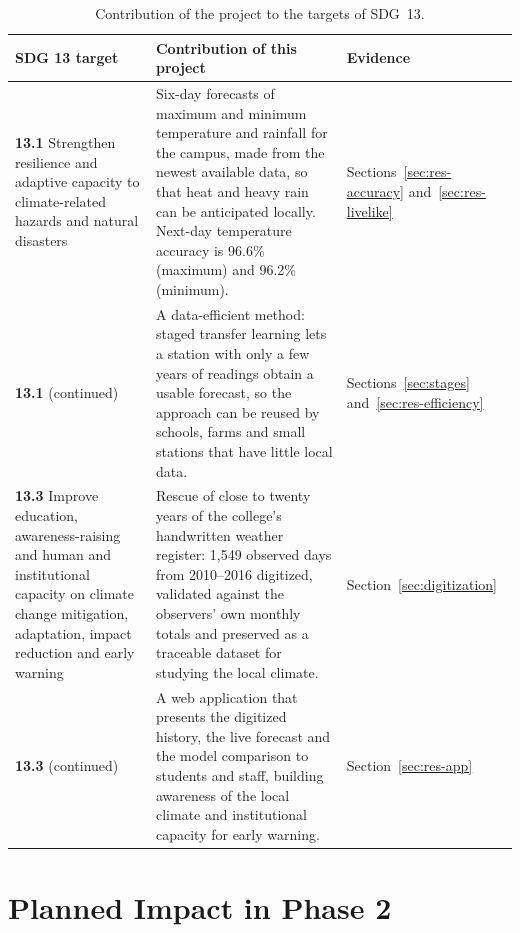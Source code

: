 \begin{table}[!htbp]
    \centering
    \caption{Contribution of the project to the targets of SDG~13.}\label{tab:sdg}
    \footnotesize
    \begin{tabularx}{\textwidth}{|L{3.6cm}|Y|L{2.6cm}|}
        \hline
        \textbf{SDG 13 target} & \textbf{Contribution of this project} & \textbf{Evidence} \\ \hline
        \textbf{13.1} Strengthen resilience and adaptive capacity to climate-related hazards and natural disasters &
        Six-day forecasts of maximum and minimum temperature and rainfall for the campus, made from the newest available data, so that heat and heavy rain can be anticipated locally. Next-day temperature accuracy is 96.6\% (maximum) and 96.2\% (minimum). &
        Sections~\ref{sec:res-accuracy} and~\ref{sec:res-livelike} \\ \hline
        \textbf{13.1} (continued) &
        A data-efficient method: staged transfer learning lets a station with only a few years of readings obtain a usable forecast, so the approach can be reused by schools, farms and small stations that have little local data. &
        Sections~\ref{sec:stages} and~\ref{sec:res-efficiency} \\ \hline
        \textbf{13.3} Improve education, awareness-raising and human and institutional capacity on climate change mitigation, adaptation, impact reduction and early warning &
        Rescue of close to twenty years of the college's handwritten weather register: 1,549 observed days from 2010--2016 digitized, validated against the observers' own monthly totals and preserved as a traceable dataset for studying the local climate. &
        Section~\ref{sec:digitization} \\ \hline
        \textbf{13.3} (continued) &
        A web application that presents the digitized history, the live forecast and the model comparison to students and staff, building awareness of the local climate and institutional capacity for early warning. &
        Section~\ref{sec:res-app} \\ \hline
    \end{tabularx}
\end{table}

\section{Planned Impact in Phase 2}
\label{app:sdg-phase2}

